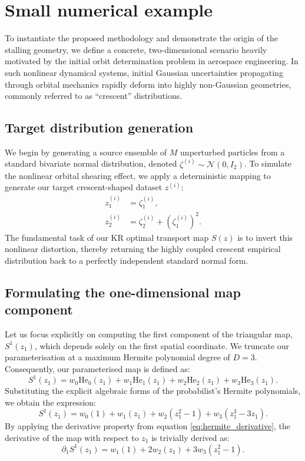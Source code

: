 \section{Small numerical example}
\label{sec:example}

To instantiate the proposed methodology and demonstrate the origin of the stalling geometry, we define a concrete, two-dimensional scenario heavily motivated by the initial orbit determination problem in aerospace engineering. In such nonlinear dynamical systems, initial Gaussian uncertainties propagating through orbital mechanics rapidly deform into highly non-Gaussian geometries, commonly referred to as ``crescent'' distributions. 

\subsection{Target distribution generation}

We begin by generating a source ensemble of $M$ unperturbed particles from a standard bivariate normal distribution, denoted ${\zeta}^{(i)} \sim \mathcal{N}({0}, {I}_2)$. To simulate the nonlinear orbital shearing effect, we apply a deterministic mapping to generate our target crescent-shaped dataset ${z}^{(i)}$:
\begin{align*}
    z_1^{(i)} &= \zeta_1^{(i)}, \\
    z_2^{(i)} &= \zeta_2^{(i)} + \left(\zeta_1^{(i)}\right)^2.
\end{align*}
The fundamental task of our KR optimal transport map ${S}({z})$ is to invert this nonlinear distortion, thereby returning the highly coupled crescent empirical distribution back to a perfectly independent standard normal form.

\subsection{Formulating the one-dimensional map component}

Let us focus explicitly on computing the first component of the triangular map, $S^1(z_1)$, which depends solely on the first spatial coordinate. We truncate our parameterisation at a maximum Hermite polynomial degree of $D=3$. Consequently, our parameterised map is defined as:
\begin{equation*}
    S^1(z_1) = w_0 \text{He}_0(z_1) + w_1 \text{He}_1(z_1) + w_2 \text{He}_2(z_1) + w_3 \text{He}_3(z_1).
\end{equation*}
Substituting the explicit algebraic forms of the probabilist's Hermite polynomials, we obtain the expression:
\begin{equation*}
    S^1(z_1) = w_0(1) + w_1(z_1) + w_2(z_1^2 - 1) + w_3(z_1^3 - 3z_1).
\end{equation*}
By applying the derivative property from equation \eqref{eq:hermite_derivative}, the derivative of the map with respect to $z_1$ is trivially derived as:
\begin{equation*}
    \partial_1 S^1(z_1) = w_1(1) + 2 w_2 (z_1) + 3 w_3 (z_1^2 - 1).
\end{equation*}

